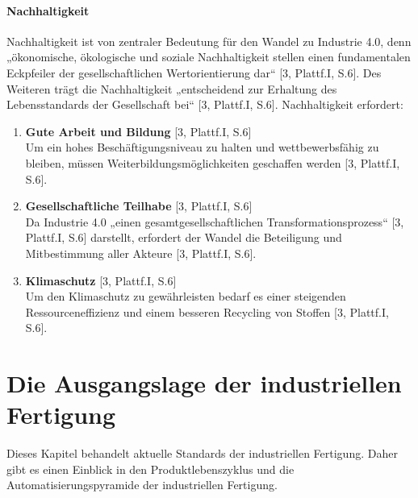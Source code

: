 \paragraph{Nachhaltigkeit}\label{sec:Nachhaltigkeit}
\noindent Nachhaltigkeit ist von zentraler Bedeutung für den Wandel zu Industrie 4.0, denn „ökonomische, ökologische und soziale Nachhaltigkeit stellen einen fundamentalen Eckpfeiler der gesellschaftlichen Wertorientierung dar“ [3, Plattf.I, S.6]. Des Weiteren trägt die Nachhaltigkeit „entscheidend zur Erhaltung des Lebensstandards der Gesellschaft bei“ [3, Plattf.I, S.6]. Nachhaltigkeit erfordert:
\begin{enumerate}
	\item \textbf{Gute Arbeit und Bildung} [3, Plattf.I, S.6] \\
	Um ein hohes Beschäftigungsniveau zu halten und wettbewerbsfähig zu bleiben, müssen
	Weiterbildungsmöglichkeiten geschaffen werden [3, Plattf.I, S.6].
	\item \textbf{Gesellschaftliche Teilhabe} [3, Plattf.I, S.6] \\
	Da Industrie 4.0 „einen gesamtgesellschaftlichen Transformationsprozess“ [3, Plattf.I, S.6]
	darstellt, erfordert der Wandel die Beteiligung und Mitbestimmung aller Akteure [3, Plattf.I, 
	S.6].
	\item \textbf{Klimaschutz} [3, Plattf.I, S.6] \\
	Um den Klimaschutz zu gewährleisten bedarf es einer steigenden Ressourceneffizienz
	und einem besseren Recycling von Stoffen [3, Plattf.I, S.6].
\end{enumerate}
\section{Die Ausgangslage der industriellen Fertigung}\label{sec:IndustrielleFertigung}
Dieses Kapitel behandelt aktuelle Standards der industriellen Fertigung. Daher gibt es einen Einblick in den Produktlebenszyklus und die Automatisierungspyramide der industriellen Fertigung.

